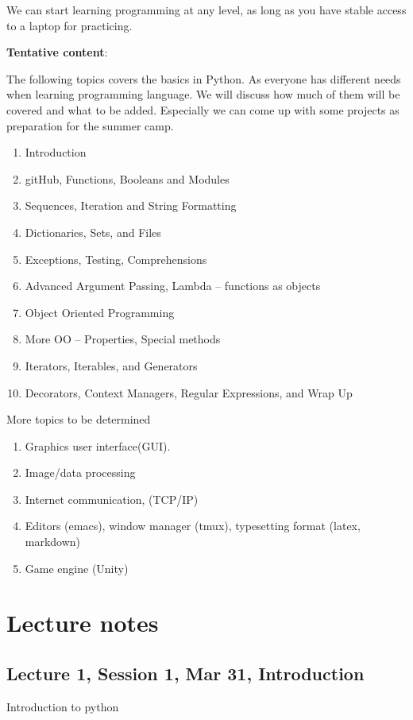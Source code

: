 \documentclass[aps,prb,12pt,tightenlines,%
notitlepage,longbibliography]{revtex4-1}
\begin{document}
We can start learning programming at any level, as long as you have
stable access to a laptop for practicing.

\newpage
\textbf{Tentative content}:

The following topics covers the basics in Python.
As everyone has
different needs when learning programming language. We will discuss
how much of them will be covered and what to be added. Especially we
can come up with some projects as preparation for the summer camp.

\begin{enumerate}

\item  Introduction
\item   gitHub, Functions, Booleans and Modules
\item   Sequences, Iteration and String Formatting
\item   Dictionaries, Sets, and Files
\item   Exceptions, Testing, Comprehensions
\item   Advanced Argument Passing, Lambda -- functions as objects
\item   Object Oriented Programming
\item   More OO -- Properties, Special methods
\item  Iterators, Iterables, and Generators
\item   Decorators, Context Managers, Regular Expressions, and Wrap Up
  
\end{enumerate}

More topics to be determined
\begin{enumerate}
\item
  Graphics user interface(GUI).
\item
  Image/data processing
\item
  Internet communication, (TCP/IP)
\item
  Editors (emacs), window manager (tmux), typesetting format (latex,
  markdown)
\item
  Game engine (Unity)
\end{enumerate}

\newpage
\tableofcontents

\section{Lecture notes}

\subsection{Lecture 1, Session 1, Mar 31, Introduction}
Introduction to python
\end{document}
